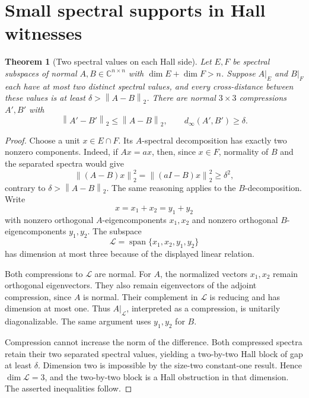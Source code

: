 \documentclass[11pt,letterpaper]{article}
\newtheorem{theorem}{Theorem}[section]\newtheorem{lemma}[theorem]{Lemma}\newtheorem{proposition}[theorem]{Proposition}\newtheorem{corollary}[theorem]{Corollary}
\theoremstyle{remark}\newtheorem{remark}[theorem]{Remark}
\newcommand{\C}{\mathbb C}\newcommand{\R}{\mathbb R}\newcommand{\cn}{C_{\mathrm{normal}}}\newcommand{\din}{d_{\infty}}
\newcommand{\norm}[1]{\left\lVert#1\right\rVert_2}\newcommand{\abs}[1]{\left|#1\right|}\newcommand{\diag}{\operatorname{diag}}\newcommand{\rank}{\operatorname{rank}}
\begin{document}
\section{Small spectral supports in Hall witnesses}\label{sec:types}
\begin{theorem}[Two spectral values on each Hall side]\label{thm:twobytwo}
Let $E,F$ be spectral subspaces of normal $A,B\in\C^{n\times n}$ with $\dim E+\dim F>n$. Suppose $A|_E$ and $B|_F$ each have at most two distinct spectral values, and every cross-distance between these values is at least $\delta>\norm{A-B}$. There are normal $3\times3$ compressions $A',B'$ with
\[
\norm{A'-B'}\le\norm{A-B},\qquad \din(A',B')\ge\delta.
\]
\end{theorem}
\begin{proof}
Choose a unit $x\in E\cap F$. Its $A$-spectral decomposition has exactly two nonzero components. Indeed, if $Ax=ax$, then, since $x\in F$, normality of $B$ and the separated spectra would give
\[
\norm{(A-B)x}^2=\norm{(aI-B)x}^2\ge\delta^2,
\]
contrary to $\delta>\norm{A-B}$. The same reasoning applies to the $B$-decomposition. Write
\[
x=x_1+x_2=y_1+y_2
\]
with nonzero orthogonal $A$-eigencomponents $x_1,x_2$ and nonzero orthogonal $B$-eigencomponents $y_1,y_2$. The subspace
\[
\mathcal L=\operatorname{span}\{x_1,x_2,y_1,y_2\}
\]
has dimension at most three because of the displayed linear relation.

Both compressions to $\mathcal L$ are normal. For $A$, the normalized vectors $x_1,x_2$ remain orthogonal eigenvectors. They also remain eigenvectors of the adjoint compression, since $A$ is normal. Their complement in $\mathcal L$ is reducing and has dimension at most one. Thus $A|_{\mathcal L}$, interpreted as a compression, is unitarily diagonalizable. The same argument uses $y_1,y_2$ for $B$.

Compression cannot increase the norm of the difference. Both compressed spectra retain their two separated spectral values, yielding a two-by-two Hall block of gap at least $\delta$. Dimension two is impossible by the size-two constant-one result. Hence $\dim\mathcal L=3$, and the two-by-two block is a Hall obstruction in that dimension. The asserted inequalities follow.
\end{proof}
\end{document}
